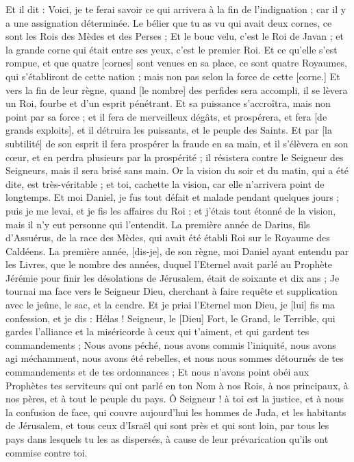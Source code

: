 \begin{multicols}{2}
Et il dit : Voici, je te ferai savoir ce qui arrivera à la fin de l'indignation ; car il y a une assignation déterminée.
Le bélier que tu as vu qui avait deux cornes, ce sont les Rois des Mèdes et des Perses ;
Et le bouc velu, c'est le Roi de Javan ; et la grande corne qui était entre ses yeux, c'est le premier Roi.
Et ce qu'elle s'est rompue, et que quatre [cornes] sont venues en sa place, ce sont quatre Royaumes, qui s'établiront de cette nation ; mais non pas selon la force de cette [corne.]
Et vers la fin de leur règne, quand [le nombre] des perfides sera accompli, il se lèvera un Roi, fourbe et d'un esprit pénétrant.
Et sa puissance s'accroîtra, mais non point par sa force ; et il fera de merveilleux dégâts, et prospérera, et fera [de grands exploits], et il détruira les puissants, et le peuple des Saints.
Et par [la subtilité] de son esprit il fera prospérer la fraude en sa main, et il s'élèvera en son cœur, et en perdra plusieurs par la prospérité ; il résistera contre le Seigneur des Seigneurs, mais il sera brisé sans main.
Or la vision du soir et du matin, qui a été dite, est très-véritable ; et toi, cachette la vision, car elle n'arrivera point de longtemps.
Et moi Daniel, je fus tout défait et malade pendant quelques jours ; puis je me levai, et je fis les affaires du Roi ; et j'étais tout étonné de la vision, mais il n'y eut personne qui l'entendit.
\VerseOne{}La première année de Darius, fils d'Assuérus, de la race des Mèdes, qui avait été établi Roi sur le Royaume des Caldéens.
La première année, [dis-je], de son règne, moi Daniel ayant entendu par les Livres, que le nombre des années, duquel l'Eternel avait parlé au Prophète Jérémie pour finir les désolations de Jérusalem, était de soixante et dix ans ;
Je tournai ma face vers le Seigneur Dieu, cherchant à faire requête et supplication avec le jeûne, le sac, et la cendre.
Et je priai l'Eternel mon Dieu, je [lui] fis ma confession, et je dis : Hélas ! Seigneur, le [Dieu] Fort, le Grand, le Terrible, qui gardes l'alliance et la miséricorde à ceux qui t'aiment, et qui gardent tes commandements ;
Nous avons péché, nous avons commis l'iniquité, nous avons agi méchamment, nous avons été rebelles, et nous nous sommes détournés de tes commandements et de tes ordonnances ;
Et nous n'avons point obéi aux Prophètes tes serviteurs qui ont parlé en ton Nom à nos Rois, à nos principaux, à nos pères, et à tout le peuple du pays.
Ô Seigneur ! à toi est la justice, et à nous la confusion de face, qui couvre aujourd'hui les hommes de Juda, et les habitants de Jérusalem, et tous ceux d'Israël qui sont près et qui sont loin, par tous les pays dans lesquels tu les as dispersés, à cause de leur prévarication qu'ils ont commise contre toi.

\end{multicols}
